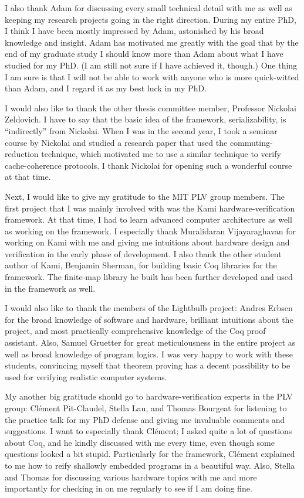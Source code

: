 \begin{singlespace}
I also thank Adam for discussing every small technical detail with me as well as keeping my research projects going in the right direction.
During my entire PhD, I think I have been mostly impressed by Adam, astonished by his broad knowledge and insight.
Adam has motivated me greatly with the goal that by the end of my graduate study I should know more than Adam about what I have studied for my PhD.
(I am still not sure if I have achieved it, though.)
One thing I am sure is that I will not be able to work with anyone who is more quick-witted than Adam, and I regard it as my best luck in my PhD.

I would also like to thank the other thesis committee member, Professor Nickolai Zeldovich.
I have to say that the basic idea of the \hemiola{} framework, serializability, is ``indirectly'' from Nickolai.
When I was in the second year, I took a seminar course by Nickolai and studied a research paper that used the commuting-reduction technique, which motivated me to use a similar technique to verify cache-coherence protocols.
I thank Nickolai for opening such a wonderful course at that time.

Next, I would like to give my gratitude to the MIT PLV group members.
The first project that I was mainly involved with was the Kami hardware-verification framework.
At that time, I had to learn advanced computer architecture as well as working on the framework.
I especially thank Muralidaran Vijayaraghavan for working on Kami with me and giving me intuitions about hardware design and verification in the early phase of development.
I also thank the other student author of Kami, Benjamin Sherman, for building basic Coq libraries for the framework.
The finite-map library he built has been further developed and used in the \hemiola{} framework as well.

I would also like to thank the members of the Lightbulb project: Andres Erbsen for the broad knowledge of software and hardware, brilliant intuitions about the project, and most practically comprehensive knowledge of the Coq proof assistant.
Also, Samuel Gruetter for great meticulousness in the entire project as well as broad knowledge of program logics.
I was very happy to work with these students, convincing myself that theorem proving has a decent possibility to be used for verifying realistic computer systems.

My another big gratitude should go to hardware-verification experts in the PLV group: Cl\'ement Pit-Claudel, Stella Lau, and Thomas Bourgeat for listening to the practice talk for my PhD defense and giving me invaluable comments and suggestions.
I want to especially thank Cl\'ement; I asked quite a lot of questions about Coq, and he kindly discussed with me every time, even though some questions looked a bit stupid.
Particularly for the \hemiola{} framework, Cl\'ement explained to me how to reify shallowly embedded programs in a beautiful way.
Also, Stella and Thomas for discussing various hardware topics with me and more importantly for checking in on me regularly to see if I am doing fine.


\end{singlespace}
